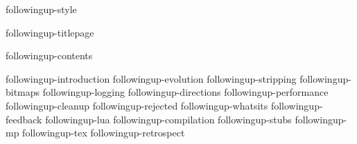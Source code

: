 \environment followingup-style

\dontcomplain

\startdocument

    \component followingup-titlepage

    \startfrontmatter
        \component followingup-contents
    \stopfrontmatter

    \startbodymatter
        \component followingup-introduction
        \component followingup-evolution
        \component followingup-stripping
        \component followingup-bitmaps
        \component followingup-logging
        \component followingup-directions
        \component followingup-performance
        \component followingup-cleanup
        \component followingup-rejected
        \component followingup-whatsits
        \component followingup-feedback
        \component followingup-lua
        \component followingup-compilation
        \component followingup-stubs
        \component followingup-mp
        \component followingup-tex
        \component followingup-retrospect
    \stopbodymatter

\stopdocument

